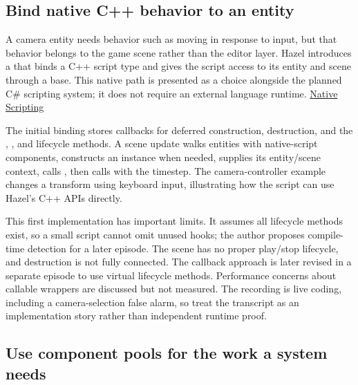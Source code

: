 \subsection{Bind native C++ behavior to an entity}\label{06-engine-ii-ch031-bind-native-c-behavior-to-an-entity}

\hypertarget{06-engine-ii-ch031-bind-native-c-behavior-to-an-entity}{}

A camera entity needs behavior such as moving in response to input, but that behavior belongs to the game scene rather than the editor layer. Hazel introduces a  that binds a C++ script type and gives the script access to its entity and scene through a  base. This native path is presented as a choice alongside the planned C\# scripting system; it does not require an external language runtime. \href{https://www.youtube.com/watch?v=iIUhg88MK5M}{Native Scripting}

The initial binding stores callbacks for deferred construction, destruction, and the , , and  lifecycle methods. A scene update walks entities with native-script components, constructs an instance when needed, supplies its entity/scene context, calls , then calls  with the timestep. The camera-controller example changes a transform using keyboard input, illustrating how the script can use Hazel's C++ APIs directly.

This first implementation has important limits. It assumes all lifecycle methods exist, so a small script cannot omit unused hooks; the author proposes compile-time detection for a later episode. The scene has no proper play/stop lifecycle, and destruction is not fully connected. The callback approach is later revised in a separate episode to use virtual lifecycle methods. Performance concerns about callable wrappers are discussed but not measured. The recording is live coding, including a camera-selection false alarm, so treat the transcript as an implementation story rather than independent runtime proof.

\subsection{Use component pools for the work a system needs}\label{06-engine-ii-ch031-use-component-pools-for-the-work-a-system-needs}

